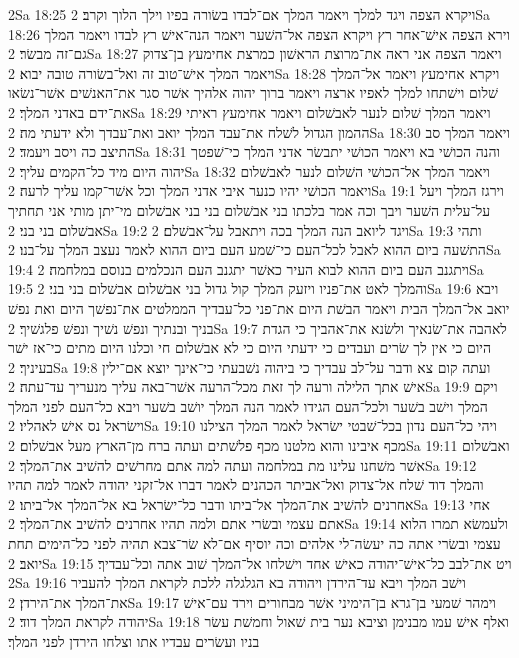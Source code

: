 2Sa 18:25  ויקרא הצפה ויגד למלך ויאמר המלך אם־לבדו בשׂורה בפיו וילך הלוך וקרב׃
2Sa 18:26  וירא הצפה אישׁ־אחר רץ ויקרא הצפה אל־השׁער ויאמר הנה־אישׁ רץ לבדו ויאמר המלך גם־זה מבשׂר׃
2Sa 18:27  ויאמר הצפה אני ראה את־מרוצת הראשׁון כמרצת אחימעץ בן־צדוק ויאמר המלך אישׁ־טוב זה ואל־בשׂורה טובה יבוא׃
2Sa 18:28  ויקרא אחימעץ ויאמר אל־המלך שׁלום וישׁתחו למלך לאפיו ארצה ויאמר ברוך יהוה אלהיך אשׁר סגר את־האנשׁים אשׁר־נשׂאו את־ידם באדני המלך׃
2Sa 18:29  ויאמר המלך שׁלום לנער לאבשׁלום ויאמר אחימעץ ראיתי ההמון הגדול לשׁלח את־עבד המלך יואב ואת־עבדך ולא ידעתי מה׃
2Sa 18:30  ויאמר המלך סב התיצב כה ויסב ויעמד׃
2Sa 18:31  והנה הכושׁי בא ויאמר הכושׁי יתבשׂר אדני המלך כי־שׁפטך יהוה היום מיד כל־הקמים עליך׃
2Sa 18:32  ויאמר המלך אל־הכושׁי השׁלום לנער לאבשׁלום ויאמר הכושׁי יהיו כנער איבי אדני המלך וכל אשׁר־קמו עליך לרעה׃
2Sa 19:1  וירגז המלך ויעל על־עלית השׁער ויבך וכה אמר בלכתו בני אבשׁלום בני בני אבשׁלום מי־יתן מותי אני תחתיך אבשׁלום בני בני׃
2Sa 19:2  ויגד ליואב הנה המלך בכה ויתאבל על־אבשׁלם׃
2Sa 19:3  ותהי התשׁעה ביום ההוא לאבל לכל־העם כי־שׁמע העם ביום ההוא לאמר נעצב המלך על־בנו׃
2Sa 19:4  ויתגנב העם ביום ההוא לבוא העיר כאשׁר יתגנב העם הנכלמים בנוסם במלחמה׃
2Sa 19:5  והמלך לאט את־פניו ויזעק המלך קול גדול בני אבשׁלום אבשׁלום בני בני׃
2Sa 19:6  ויבא יואב אל־המלך הבית ויאמר הבשׁת היום את־פני כל־עבדיך הממלטים את־נפשׁך היום ואת נפשׁ בניך ובנתיך ונפשׁ נשׁיך ונפשׁ פלגשׁיך׃
2Sa 19:7  לאהבה את־שׂנאיך ולשׂנא את־אהביך כי הגדת היום כי אין לך שׂרים ועבדים כי ידעתי היום כי לא אבשׁלום חי וכלנו היום מתים כי־אז ישׁר בעיניך׃
2Sa 19:8  ועתה קום צא ודבר על־לב עבדיך כי ביהוה נשׁבעתי כי־אינך יוצא אם־ילין אישׁ אתך הלילה ורעה לך זאת מכל־הרעה אשׁר־באה עליך מנעריך עד־עתה׃
2Sa 19:9  ויקם המלך וישׁב בשׁער ולכל־העם הגידו לאמר הנה המלך יושׁב בשׁער ויבא כל־העם לפני המלך וישׂראל נס אישׁ לאהליו׃
2Sa 19:10  ויהי כל־העם נדון בכל־שׁבטי ישׂראל לאמר המלך הצילנו מכף איבינו והוא מלטנו מכף פלשׁתים ועתה ברח מן־הארץ מעל אבשׁלום׃
2Sa 19:11  ואבשׁלום אשׁר משׁחנו עלינו מת במלחמה ועתה למה אתם מחרשׁים להשׁיב את־המלך׃
2Sa 19:12  והמלך דוד שׁלח אל־צדוק ואל־אביתר הכהנים לאמר דברו אל־זקני יהודה לאמר למה תהיו אחרנים להשׁיב את־המלך אל־ביתו ודבר כל־ישׂראל בא אל־המלך אל־ביתו׃
2Sa 19:13  אחי אתם עצמי ובשׂרי אתם ולמה תהיו אחרנים להשׁיב את־המלך׃
2Sa 19:14  ולעמשׂא תמרו הלוא עצמי ובשׂרי אתה כה יעשׂה־לי אלהים וכה יוסיף אם־לא שׂר־צבא תהיה לפני כל־הימים תחת יואב׃
2Sa 19:15  ויט את־לבב כל־אישׁ־יהודה כאישׁ אחד וישׁלחו אל־המלך שׁוב אתה וכל־עבדיך׃
2Sa 19:16  וישׁב המלך ויבא עד־הירדן ויהודה בא הגלגלה ללכת לקראת המלך להעביר את־המלך את־הירדן׃
2Sa 19:17  וימהר שׁמעי בן־גרא בן־הימיני אשׁר מבחורים וירד עם־אישׁ יהודה לקראת המלך דוד׃
2Sa 19:18  ואלף אישׁ עמו מבנימן וציבא נער בית שׁאול וחמשׁת עשׂר בניו ועשׂרים עבדיו אתו וצלחו הירדן לפני המלך׃
